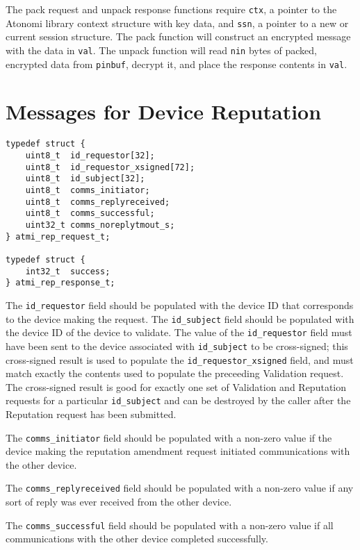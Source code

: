 The pack request and unpack response functions require \texttt{ctx}, a pointer
to the Atonomi library context structure with key data, and \texttt{ssn},
a pointer to a new or current session structure. The pack function will
construct an encrypted message with the data in \texttt{val}. The unpack function
will read \texttt{nin} bytes of packed, encrypted data from \texttt{pinbuf},
decrypt it, and place the response contents in \texttt{val}.


\section{Messages for Device Reputation}
\begin{lstlisting}[float=h,name=Reputation Request and Response Structures]
typedef struct {
	uint8_t  id_requestor[32];
	uint8_t  id_requestor_xsigned[72];
	uint8_t  id_subject[32];
	uint8_t  comms_initiator;
	uint8_t  comms_replyreceived;
	uint8_t  comms_successful;
	uint32_t comms_noreplytmout_s;
} atmi_rep_request_t;

typedef struct {
	int32_t  success;
} atmi_rep_response_t;
\end{lstlisting}

The \texttt{id_requestor} field should be populated with the device ID that
corresponds to the device making the request. The \texttt{id_subject} field
should be populated with the device ID of the device to validate. The value
of the \texttt{id_requestor} field must have been sent to the device associated
with \texttt{id_subject} to be cross-signed; this cross-signed result is used
to populate the \texttt{id_requestor_xsigned} field, and must match exactly
the contents used to populate the preceeding Validation request. The
cross-signed result is good for exactly one set of Validation and Reputation
requests for a particular \texttt{id_subject} and can be destroyed by the caller
after the Reputation request has been submitted.

The \texttt{comms_initiator} field should be populated with a non-zero value
if the device making the reputation amendment request initiated communications
with the other device.

The \texttt{comms_replyreceived} field should be populated with a non-zero value
if any sort of reply was ever received from the other device.

The \texttt{comms_successful} field should be populated with a non-zero value
if all communications with the other device completed successfully.

